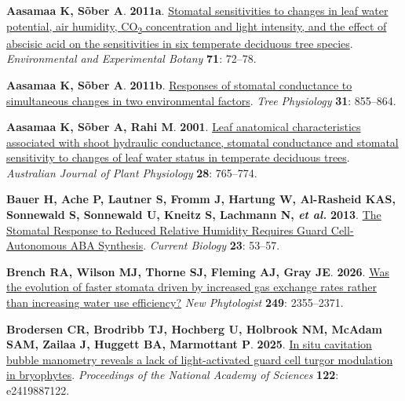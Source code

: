 \documentclass[
  letterpaper,
  DIV=11,
  numbers=noendperiod]{scrartcl}
\newlength{\cslhangindent}
\newenvironment{CSLReferences}[2] %
 {\begin{list}{}{%
  \setlength{\itemindent}{0pt}
  \setlength{\leftmargin}{0pt}
  \setlength{\parsep}{0pt}
  \ifodd #1
   \setlength{\leftmargin}{\cslhangindent}
   \setlength{\itemindent}{-1\cslhangindent}
  \fi
  \setlength{\itemsep}{#2\baselineskip}}}
 {\end{list}}
\begin{document}
\label{refs}
\begin{CSLReferences}{0}{1}
\textbf{\textbf{Aasamaa K}, \textbf{Sõber A}}. \textbf{2011a}.
\href{https://doi.org/10.1016/j.envexpbot.2010.10.013}{Stomatal
sensitivities to changes in leaf water potential, air humidity,
{CO}{\textsubscript{2}} concentration and light intensity, and the
effect of abscisic acid on the sensitivities in six temperate deciduous
tree species}. \emph{Environmental and Experimental Botany} \textbf{71}:
72--78.

\textbf{\textbf{Aasamaa K}, \textbf{Sõber A}}. \textbf{2011b}.
\href{https://doi.org/10.1093/treephys/tpr078}{Responses of stomatal
conductance to simultaneous changes in two environmental factors}.
\emph{Tree Physiology} \textbf{31}: 855--864.

\textbf{\textbf{Aasamaa K}, \textbf{Sõber A}, \textbf{Rahi M}}.
\textbf{2001}. \href{https://doi.org/10.1071/PP00157}{Leaf anatomical
characteristics associated with shoot hydraulic conductance, stomatal
conductance and stomatal sensitivity to changes of leaf water status in
temperate deciduous trees}. \emph{Australian Journal of Plant
Physiology} \textbf{28}: 765--774.

\textbf{\textbf{Bauer H}, \textbf{Ache P}, \textbf{Lautner S},
\textbf{Fromm J}, \textbf{Hartung W}, \textbf{Al-Rasheid KAS},
\textbf{Sonnewald S}, \textbf{Sonnewald U}, \textbf{Kneitz S},
\textbf{Lachmann N}, \emph{et al.}} \textbf{2013}.
\href{https://doi.org/10.1016/j.cub.2012.11.022}{The {Stomatal Response}
to {Reduced Relative Humidity Requires Guard Cell-Autonomous ABA
Synthesis}}. \emph{Current Biology} \textbf{23}: 53--57.

\textbf{\textbf{Brench RA}, \textbf{Wilson MJ}, \textbf{Thorne SJ},
\textbf{Fleming AJ}, \textbf{Gray JE}}. \textbf{2026}.
\href{https://doi.org/10.1111/nph.70830}{Was the evolution of faster
stomata driven by increased gas exchange rates rather than increasing
water use efficiency?} \emph{New Phytologist} \textbf{249}: 2355--2371.

\textbf{\textbf{Brodersen CR}, \textbf{Brodribb TJ}, \textbf{Hochberg
U}, \textbf{Holbrook NM}, \textbf{McAdam SAM}, \textbf{Zailaa J},
\textbf{Huggett BA}, \textbf{Marmottant P}}. \textbf{2025}.
\href{https://doi.org/10.1073/pnas.2419887122}{In situ cavitation bubble
manometry reveals a lack of light-activated guard cell turgor modulation
in bryophytes}. \emph{Proceedings of the National Academy of Sciences}
\textbf{122}: e2419887122.


\end{CSLReferences}
\end{document}
